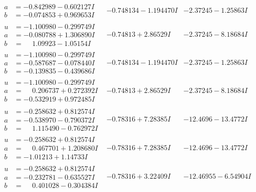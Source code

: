 \documentclass[1p]{elsarticle_modified}
\theoremstyle{definition}
\begin{document}
$$\begin{array}{c|c|c}
\begin{aligned}
a &= -0.842989 - 0.602127 I \\
b &= -0.074853 + 0.969653 I\end{aligned}
 & -0.748134 - 1.194470 I & -2.37245 - 1.25863 I \\ \hline\begin{aligned}
u &= -1.100980 - 0.299749 I \\
a &= -0.080788 + 1.306890 I \\
b &= \phantom{-}1.09923 - 1.05154 I\end{aligned}
 & -0.74813 + 2.86529 I & -2.37245 - 8.18684 I \\ \hline\begin{aligned}
u &= -1.100980 - 0.299749 I \\
a &= -0.587687 - 0.078440 I \\
b &= -0.139835 - 0.439686 I\end{aligned}
 & -0.748134 - 1.194470 I & -2.37245 - 1.25863 I \\ \hline\begin{aligned}
u &= -1.100980 - 0.299749 I \\
a &= \phantom{-}0.206737 + 0.272392 I \\
b &= -0.532919 + 0.972485 I\end{aligned}
 & -0.74813 + 2.86529 I & -2.37245 - 8.18684 I \\ \hline\begin{aligned}
u &= -0.258632 + 0.812574 I \\
a &= -0.538970 - 0.790372 I \\
b &= \phantom{-}1.115490 - 0.762972 I\end{aligned}
 & -0.78316 + 7.28385 I & -12.4696 - 13.4772 I \\ \hline\begin{aligned}
u &= -0.258632 + 0.812574 I \\
a &= \phantom{-}0.467701 + 1.208680 I \\
b &= -1.01213 + 1.14733 I\end{aligned}
 & -0.78316 + 7.28385 I & -12.4696 - 13.4772 I \\ \hline\begin{aligned}
u &= -0.258632 + 0.812574 I \\
a &= -0.232781 - 0.635527 I \\
b &= \phantom{-}0.401028 - 0.304384 I\end{aligned}
 & -0.78316 + 3.22409 I & -12.46955 - 6.54904 I \\ \hline\begin{aligned}

\end{aligned}
\end{array}$$
\end{document}
